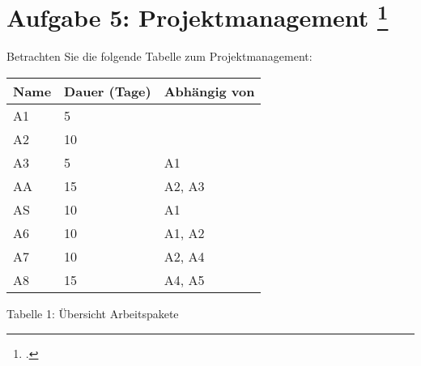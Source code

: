 \documentclass{lehramt-informatik-aufgabe}
\begin{document}

\section{Aufgabe 5: Projektmanagement
\footcite[Thema 1 Teilaufgabe 1 Aufgabe 5]{examen:46116:2017:03}}

Betrachten Sie die folgende Tabelle zum Projektmanagement:

\begin{center}
\begin{tabular}{|l|l|l|}
\hline
Name & Dauer (Tage) & Abhängig von\\\hline\hline
A1 & 5 & \\\hline
A2 & 10 & \\\hline
A3 & 5  & A1 \\\hline
AA & 15 & A2, A3\\\hline
AS & 10 & A1 \\\hline
A6 & 10 & A1, A2\\\hline
A7 & 10 & A2, A4\\\hline
A8 & 15 & A4, A5\\\hline
\end{tabular}
\end{center}

Tabelle 1: Übersicht Arbeitspakete
\end{document}
